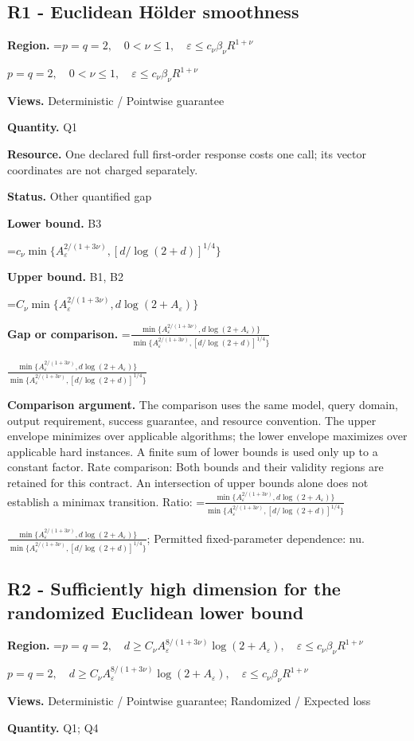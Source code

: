 \documentclass[10pt,a4paper]{article}
\newcommand{\AtlasMath}[1]{\par\begingroup\centering\setbox0=\hbox{$\displaystyle #1$}\ifdim\wd0>1.4\linewidth\typeout{ATLAS WIDE FORMULA: \the\wd0}\fi\ifdim\wd0>\linewidth\resizebox{\linewidth}{!}{\box0}\else\box0\fi\par\endgroup}
\newcommand{\AtlasInlineMath}[1]{\begingroup\setbox0=\hbox{$#1$}\ifdim\wd0>.4\linewidth\endgroup\AtlasMath{#1}\else\endgroup$#1$\fi}
\begin{document}
\subsection{R1 - Euclidean Hölder smoothness}
\textbf{Region.} \AtlasInlineMath{p=q=2,\quad0<\nu\le1,\quad\varepsilon\le c_\nu\beta_\nu R^{1+\nu}}

\textbf{Views.} Deterministic / Pointwise guarantee

\textbf{Quantity.} Q1

\textbf{Resource.} One declared full first-order response costs one call; its vector coordinates are not charged separately.

\textbf{Status.} Other quantified gap

\textbf{Lower bound.} B3

\AtlasMath{c_\nu\min\{A_\varepsilon^{2/(1+3\nu)},[d/\log(2+d)]^{1/4}\}}
\textbf{Upper bound.} B1, B2

\AtlasMath{C_\nu\min\{A_\varepsilon^{2/(1+3\nu)},d\log(2+A_\varepsilon)\}}
\textbf{Gap or comparison.} \AtlasInlineMath{\frac{\min\{A_\varepsilon^{2/(1+3\nu)},d\log(2+A_\varepsilon)\}}{\min\{A_\varepsilon^{2/(1+3\nu)},[d/\log(2+d)]^{1/4}\}}}

\textbf{Comparison argument.} The comparison uses the same model, query domain, output requirement, success guarantee, and resource convention. The upper envelope minimizes over applicable algorithms; the lower envelope maximizes over applicable hard instances. A finite sum of lower bounds is used only up to a constant factor. Rate comparison: Both bounds and their validity regions are retained for this contract. An intersection of upper bounds alone does not establish a minimax transition. Ratio: \AtlasInlineMath{\frac{\min\{A_\varepsilon^{2/(1+3\nu)},d\log(2+A_\varepsilon)\}}{\min\{A_\varepsilon^{2/(1+3\nu)},[d/\log(2+d)]^{1/4}\}}}; Permitted fixed-parameter dependence: nu.

\subsection{R2 - Sufficiently high dimension for the randomized Euclidean lower bound}
\textbf{Region.} \AtlasInlineMath{p=q=2,\quad d\ge C_\nu A_\varepsilon^{8/(1+3\nu)}\log(2+A_\varepsilon),\quad\varepsilon\le c_\nu\beta_\nu R^{1+\nu}}

\textbf{Views.} Deterministic / Pointwise guarantee; Randomized / Expected loss

\textbf{Quantity.} Q1; Q4
\end{document}
